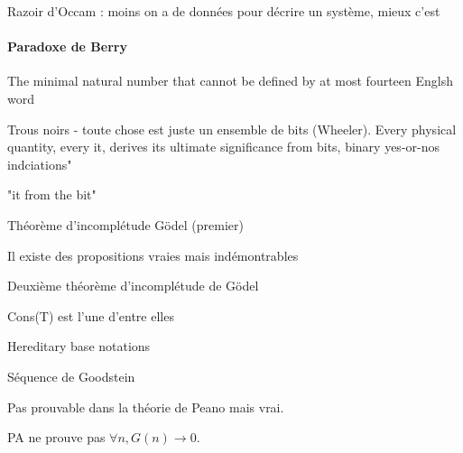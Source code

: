 \begin{definition}
Razoir d'Occam : moins on a de données pour décrire un système, mieux c'est
\end{definition}


\paragraph{Paradoxe de Berry} The minimal natural number that cannot be defined by at most fourteen Englsh word
\begin{definition}
Trous noirs - toute chose est juste un ensemble de bits (Wheeler). Every physical quantity, every it, derives its ultimate significance from bits, binary yes-or-nos indciations"
\par "it from the bit"
\end{definition}

\begin{theorem}
Théorème d'incomplétude Gödel (premier)
\par Il existe des propositions vraies mais indémontrables
\end{theorem}

\begin{theorem}
Deuxième théorème d'incomplétude de Gödel
\par Cons(T) est l'une d'entre elles
\end{theorem}

\begin{definition}
Hereditary base notations
\par Séquence de Goodstein
\end{definition}

\par Pas prouvable dans la théorie de Peano mais vrai.

\begin{theorem}
PA ne prouve pas $\forall n, G(n) \rightarrow 0$.
\end{theorem}
